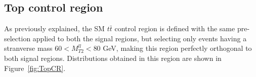 \documentclass[a4paper, 10pt, openright]{report}
\begin{document}
\subsection{Top control region} \label{section:TopCR}

As previously explained, the \ac{SM} $t \bar t$ control region is defined with the same pre-selection applied to both the signal regions, but selecting only events having a stranverse mass $60 < M_{T2}^{ll} < 80$ GeV, making this region perfectly orthogonal to both signal regions. Distributions obtained in this region are shown in Figure~\ref{fig:TopCR}.

\begin{figure}[htbp]
\centering
{}
\end{figure}
\end{document}
